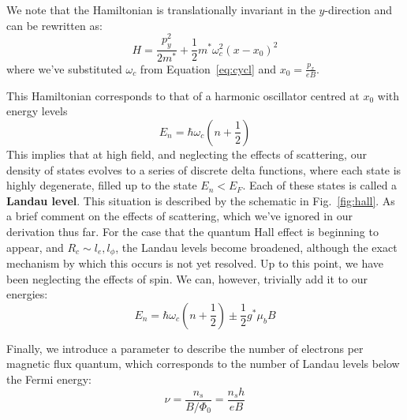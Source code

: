 We note that the Hamiltonian is translationally invariant in the $y$-direction and can be rewritten as:
\begin{equation}
  H = \frac{p_y^2}{2m^*} + \frac{1}{2}m^*\omega_c^2(x - x_0)^2
\end{equation}
where we've substituted $\omega_c$ from Equation~\ref{eq:cycl} and $x_0 = \tfrac{p_x}{eB}$.

This Hamiltonian corresponds to that of a harmonic oscillator centred at $x_0$ with energy levels
\begin{equation}
  E_n = \hbar \omega_c\left(n + \frac{1}{2}\right)
\end{equation}
This implies that at high field, and neglecting the effects of scattering, our density of states evolves to
a series of discrete delta functions, where each state is highly degenerate, filled up to the state $E_n < E_F$.
Each of these states is called a \textbf{Landau level}. This situation is described by the schematic in Fig.~\ref{fig:hall}.
As a brief comment on the effects of scattering, which we've ignored in our derivation thus far. For the case that the quantum Hall effect is beginning to appear, and $R_c \sim l_e, l_\phi$, the Landau levels become broadened, although the exact mechanism
by which this occurs is not yet resolved\cite{PhysRevB.90.035425, PhysRevB.82.075401}. Up to this point,
we have been neglecting the effects of spin. We can, however, trivially add it to our energies:
\begin{equation}
  E_n = \hbar \omega_c\left(n + \frac{1}{2}\right) \pm \frac{1}{2}g^* \mu_b B
\end{equation}

Finally, we introduce a parameter to describe the number of electrons per magnetic flux quantum, which corresponds
to the number of Landau levels below the Fermi energy:
\begin{equation}
  \nu = \frac{n_s}{B / \Phi_0} = \frac{n_s h}{e B}
  \label{eq:nu}
\end{equation}

